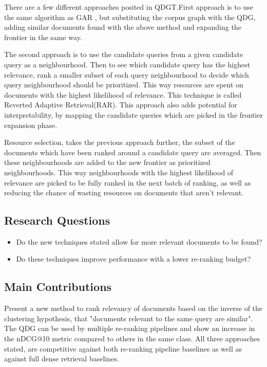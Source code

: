 \documentclass[sigconf,authorversion,nonacm]{acmart}
\begin{document}
There are a few different approaches posited in QDGT\cite{query-document}.First approach is to use
the same algorithm as GAR\cite{gar} , but substituting the corpus graph with the QDG, adding similar
documents found with the above method and expanding the frontier in the same way.

The second approach is to use the candidate queries from a given candidate query as a neighbourhood.
Then to see which candidate query has the highest relevance, rank a smaller subset of each query
neighbourhood to decide which query neighbourhood should be prioritized. This way resources are
spent on documents with the highest likelihood of relevance. This technique is called Reverted
Adaptive Retrieval(RAR). This approach also adds potential for interpretability, by mapping the
candidate queries which are picked in the frontier expansion phase.

Resource selection, takes the previous approach further, the subset of the documents which have
been ranked around a candidate query are averaged. Then these neighbourhoods are added to the new
frontier as prioritized neighbourhoods. This way neighbourhoods with the highest likelihood of
relevance are picked to be fully ranked in the next batch of ranking, as well as reducing the chance
of wasting resources on documents that aren't relevant.

\subsection{Research Questions}

\begin{itemize}
	\item Do the new techniques stated allow for more relevant documents to be found?
	\item Do these techniques improve performance with a lower re-ranking budget?
\end{itemize}


\subsection{Main Contributions}

Present a new method to rank relevancy of documents based on the inverse of the clustering
hypothesis, that "documents relevant to the same query are similar"\cite{query-document}. The QDG can be
used by multiple re-ranking pipelines and show an increase in the nDCG@10 metric compared to others
in the same class. All three approaches stated, are competitive against both re-ranking pipeline
baselines as well as against full dense retrieval baselines.
\end{document}
